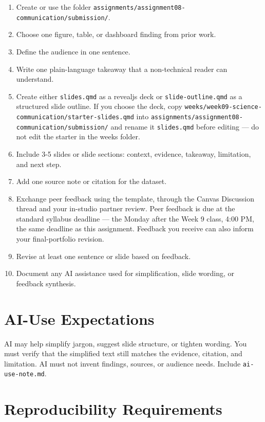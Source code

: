 \documentclass[
  letterpaper,
  DIV=11,
  numbers=noendperiod,
  oneside]{scrreprt}
\providecommand{\tightlist}{%
  \setlength{\itemsep}{0pt}\setlength{\parskip}{0pt}}
\begin{document}
\begin{enumerate}
\def\labelenumi{\arabic{enumi}.}
\tightlist
\item
  Create or use the folder
  \texttt{assignments/assignment08-communication/submission/}.
\item
  Choose one figure, table, or dashboard finding from prior work.
\item
  Define the audience in one sentence.
\item
  Write one plain-language takeaway that a non-technical reader can
  understand.
\item
  Create either \texttt{slides.qmd} as a revealjs deck or
  \texttt{slide-outline.qmd} as a structured slide outline. If you
  choose the deck, copy
  \texttt{weeks/week09-science-communication/starter-slides.qmd} into
  \texttt{assignments/assignment08-communication/submission/} and rename
  it \texttt{slides.qmd} before editing --- do not edit the starter in
  the weeks folder.
\item
  Include 3-5 slides or slide sections: context, evidence, takeaway,
  limitation, and next step.
\item
  Add one source note or citation for the dataset.
\item
  Exchange peer feedback using the template, through the Canvas
  Discussion thread and your in-studio partner review. Peer feedback is
  due at the standard syllabus deadline --- the Monday after the Week 9
  class, 4:00 PM, the same deadline as this assignment. Feedback you
  receive can also inform your final-portfolio revision.
\item
  Revise at least one sentence or slide based on feedback.
\item
  Document any AI assistance used for simplification, slide wording, or
  feedback synthesis.
\end{enumerate}

\section{AI-Use Expectations}\label{ai-use-expectations-7}

AI may help simplify jargon, suggest slide structure, or tighten
wording. You must verify that the simplified text still matches the
evidence, citation, and limitation. AI must not invent findings,
sources, or audience needs. Include \texttt{ai-use-note.md}.

\section{Reproducibility
Requirements}\label{reproducibility-requirements-7}
\end{document}
